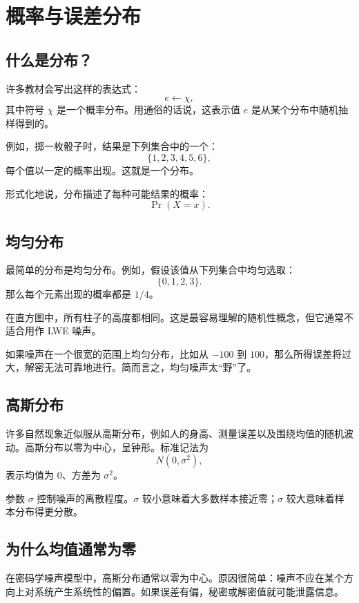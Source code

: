 \chapter{概率与误差分布}
\label{ch:prob}

\section{什么是分布？}

许多教材会写出这样的表达式：
\[
e \leftarrow \chi,
\]
其中符号 $\chi$ 是一个概率分布。用通俗的话说，这表示值 $e$ 是从某个分布中随机抽样得到的。

例如，掷一枚骰子时，结果是下列集合中的一个：
\[
\{1,2,3,4,5,6\},
\]
每个值以一定的概率出现。这就是一个分布。

形式化地说，分布描述了每种可能结果的概率：
\[
\Pr(X=x).
\]

\section{均匀分布}

最简单的分布是均匀分布。例如，假设该值从下列集合中均匀选取：
\[
\{0,1,2,3\}.
\]
那么每个元素出现的概率都是 $1/4$。

在直方图中，所有柱子的高度都相同。这是最容易理解的随机性概念，但它通常不适合用作 LWE 噪声。

如果噪声在一个很宽的范围上均匀分布，比如从 $-100$ 到 $100$，那么所得误差将过大，解密无法可靠地进行。简而言之，均匀噪声太“野”了。

\section{高斯分布}

许多自然现象近似服从高斯分布，例如人的身高、测量误差以及围绕均值的随机波动。高斯分布以零为中心，呈钟形。标准记法为
\[
N(0,\sigma^2),
\]
表示均值为 $0$、方差为 $\sigma^2$。

参数 $\sigma$ 控制噪声的离散程度。$\sigma$ 较小意味着大多数样本接近零；$\sigma$ 较大意味着样本分布得更分散。

\section{为什么均值通常为零}

在密码学噪声模型中，高斯分布通常以零为中心。原因很简单：噪声不应在某个方向上对系统产生系统性的偏置。如果误差有偏，秘密或解密值就可能泄露信息。

